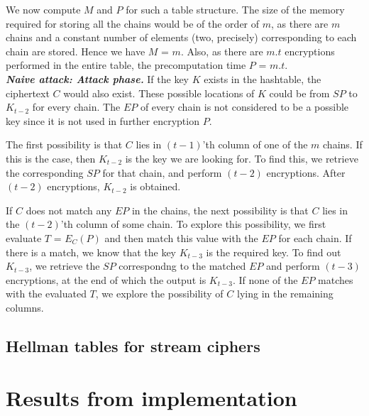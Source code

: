We now compute $M$ and $P$ for such a table structure. The size of the memory required for storing all the chains would be of the order of $m$, as there are $m$ chains and a constant number of elements (two, precisely) corresponding to each chain are stored. Hence we have $M$ = $m$. Also, as there are $m.t$ encryptions performed in the entire table, the precomputation time $P$ = $m.t$.\\

\noindent  \textit{\textbf{Naive attack: Attack phase.}} If the key $K$ exists in the hashtable, the ciphertext $C$ would also exist. These possible locations of $K$ could be from $SP$ to $K_{t-2}$ for every chain. The $EP$ of every chain is not considered to be a possible key since it is not used in further encryption $P$. 

The first possibility is that $C$ lies in $(t-1)$'th column of one of the $m$ chains. If this is the case, then $K_{t-2}$ is the key we are looking for. To find this, we retrieve the corresponding $SP$ for that chain, and perform $(t-2)$ encryptions. After $(t-2)$ encryptions, $K_{t-2}$ is obtained. 

If $C$ does not match any $EP$ in the chains, the next possibility is that $C$ lies in the $(t-2)$'th column of some chain. To explore this possibility, we first evaluate $T$ = $E_{C}(P)$ and then match this value with the $EP$ for each chain. If there is a match, we know that the key $K_{t-3}$ is the required key. To find out $K_{t-3}$, we retrieve the $SP$ correspondng to the matched $EP$ and perform $(t-3)$ encryptions, at the end of which the output is $K_{t-3}$. If none of the $EP$ matches with the evaluated $T$, we explore the possibility of $C$ lying in the remaining columns. 




\subsection{Hellman tables for stream ciphers}


\section{Results from implementation}



	

